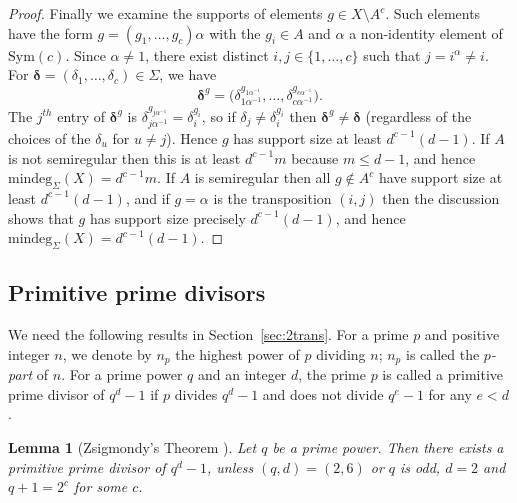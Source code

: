 \documentclass[12pt]{amsart}
\newtheorem{lem}[thm]{Lemma}
\theoremstyle{remark}
\theoremstyle{definition}
\newcommand{\sym}{\mathrm{Sym}}
\begin{document}
\begin{proof}
Finally we examine the supports of elements $g \in X \setminus A^c$. Such elements have the form $g = (g_1, \dots, g_c)\alpha$ with the $g_i \in A$ and $\alpha$ a non-identity element of $\sym(c)$. Since $\alpha \ne 1$, there exist distinct $i, j \in \{1, \dots, c\}$ such that $j=i^\alpha \ne i$. For ${\boldsymbol\delta} = (\delta_1, \dots, \delta_c) \in \Sigma$, we have
	\[ 
	{\boldsymbol\delta}^g = \big(\delta_{1\alpha^{-1}}^{g_{1\alpha^{-1}}}, \dots, \delta_{c\alpha^{-1}}^{g_{c\alpha^{-1}}}\big). 
	\]
The $j^{th}$ entry of ${\boldsymbol\delta}^g$ is $\delta_{j\alpha^{-1}}^{g_{j\alpha^{-1}}} = \delta_i^{g_i}$, so if $\delta_j \ne \delta_{i}^{g_i}$ then ${\boldsymbol\delta}^g \ne {\boldsymbol\delta}$ (regardless of the choices of the $\delta_u$ for $u \ne j$). Hence $g$ has support size at least $d^{c-1}(d-1)$. If $A$ is not semiregular then this is at least $d^{c-1}m$ because $m \leqslant d-1$, and hence $\textrm{mindeg}_\Sigma(X) = d^{c-1}m$.
If $A$ is semiregular then   all $g\not\in A^c$ have support size at least $d^{c-1}(d-1)$, and if $g=\alpha$ is the transposition $(i,j)$ then the discussion shows that $g$ has support size precisely $d^{c-1}(d-1)$, and hence $\textrm{mindeg}_\Sigma(X) = d^{c-1}(d-1)$. 
\end{proof}


\subsection{Primitive prime divisors} We need the following results in Section~\ref{sec:2trans}.
%
For a prime $p$ and positive integer $n$, we denote by $n_p$ the highest power of $p$ dividing $n$; $n_p$ is called the \emph{$p$-part} of $n$. For a prime power $q$ and an integer $d$, the prime $p$ is called a primitive prime divisor  of $q^d-1$ if $p$ divides $q^d-1$ and does not divide $q^e-1$ for any $e<d$.  

\begin{lem}[Zsigmondy's Theorem \cite{zsig}]
\label{lem:zsig}
Let $q$ be a prime power. Then there exists a primitive prime divisor of $q^d-1$, unless $(q,d)=(2,6)$ or $q$ is odd, $d=2$ and $q+1 = 2^c$ for some $c$.
\end{lem}
\end{document}
